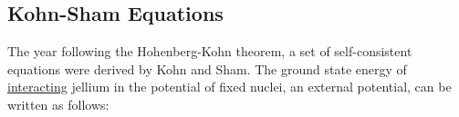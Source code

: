 \subsection{Kohn-Sham Equations}

The year following the Hohenberg-Kohn theorem, a set of self-consistent equations were derived by Kohn and Sham.  The ground state energy of \underline{interacting} \gls{jellium} in the potential of fixed nuclei, an external potential, can be written as follows\cite{kohnsham}: 

